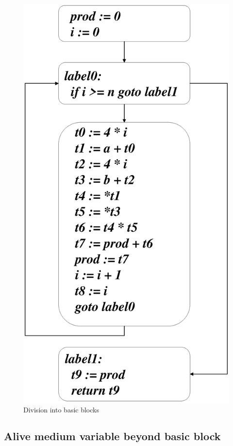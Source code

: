 \begin{figure}[htbp]
\begin{center}
\includegraphics[width=0.8\linewidth,height=1.436\linewidth]{basic_block.eps}
\caption{Division into basic blocks}
\label{optimize_e000}
\end{center}
\end{figure}

\subsection{Alive medium variable beyond basic block}

